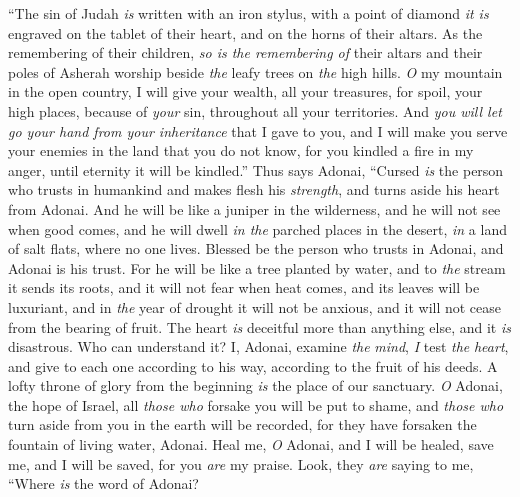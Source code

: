 \begin{biblechapter} %
 “The sin of Judah \textit{is} written with an iron stylus, 
with a point of diamond \textit{it is} engraved 
on the tablet of their heart, 
and on the horns of their altars.
\verse As the remembering of their children, 
\textit{so is the remembering of} their altars 
and their poles of Asherah worship 
beside \textit{the} leafy trees on \textit{the} high hills.
\verse \textit{O} my mountain in the open country, 
I will give your wealth, all your treasures, for spoil, 
your high places, because of \textit{your} sin, 
throughout all your territories.
\verse And \textit{you will let go your hand from your inheritance} 
that I gave to you, 
and I will make you serve your enemies 
in the land that you do not know, 
for you kindled a fire in my anger, 
until eternity it will be kindled.”
 Thus says Adonai,
\verse “Cursed \textit{is} the person who trusts in humankind 
and makes flesh his \textit{strength}, 
and turns aside his heart from Adonai.
\verse And he will be like a juniper in the wilderness, 
and he will not see when good comes, 
and he will dwell \textit{in the} parched places in the desert, 
\textit{in} a land of salt flats, where no one lives.
\verse Blessed be the person who trusts in Adonai, 
and Adonai is his trust.
\verse For he will be like a tree planted by water, 
and to \textit{the} stream it sends its roots, 
and it will not fear when heat comes, 
and its leaves will be luxuriant, 
and in \textit{the} year of drought it will not be anxious, 
and it will not cease from the bearing of fruit.
\verse The heart \textit{is} deceitful more than anything else, 
and it \textit{is} disastrous. Who can understand it?
\verse I, Adonai, examine \textit{the} \textit{mind}, 
\textit{I} test \textit{the} \textit{heart}, 
and give to each one according to his way, 
according to the fruit of his deeds.
 A lofty throne of glory from the beginning 
\textit{is} the place of our sanctuary.
\verse \textit{O} Adonai, the hope of Israel, 
all \textit{those who} forsake you will be put to shame, 
and \textit{those who} turn aside from you in the earth will be recorded, 
for they have forsaken the fountain of living water, Adonai.
\verse Heal me, \textit{O} Adonai, and I will be healed, 
save me, and I will be saved, 
for you \textit{are} my praise.
\verse Look, they \textit{are} saying to me, 
“Where \textit{is} the word of Adonai? 

\end{biblechapter}
